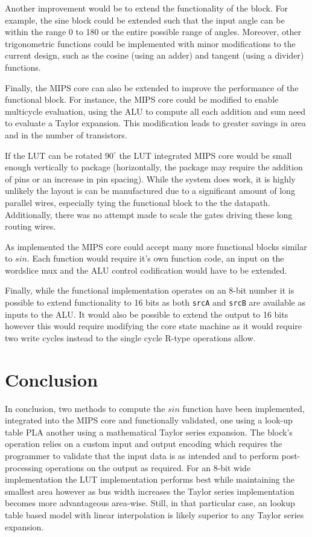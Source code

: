 \documentclass[10pt,journal]{IEEEtran}
\begin{document}
Another improvement would be to extend the functionality of the block. For example, the sine block could be extended such that the input angle can be within the range 0 to 180 or the entire possible range of angles. Moreover, other trigonometric functions could be implemented with minor modifications to the current design, such as the cosine (using an adder) and tangent (using a divider) functions.

Finally, the MIPS core can also be extended to improve the performance of the functional block. For instance, the MIPS core could be modified to enable multicycle evaluation, using the ALU to compute all each addition and sum need to evaluate a Taylor expansion. This modification  leads to greater savings in area and in the number of transistors.

If the LUT can be rotated $90^{\circ}$ the LUT integrated MIPS core would be small enough vertically to package (horizontally, the package may require the addition of pins or an increase in pin spacing). While the system does work, it is highly unlikely the layout is can be manufactured due to a significant amount of long parallel wires, especially tying the functional block to the the datapath. Additionally, there was no attempt made to scale the gates driving these long routing wires.

As implemented the MIPS core could accept many more functional blocks similar to $sin$. Each function would require it's own function code, an input on the wordslice mux and the ALU control codification would have to be extended.

Finally, while the functional implementation operates on an 8-bit number it is possible to extend functionality to 16 bits as both \texttt{srcA} and \texttt{srcB} are available as inputs to the ALU. It would also be possible to extend the output to 16 bits however this would require modifying the core state machine as it would require two write cycles instead to the single cycle R-type operations allow.

\section{Conclusion}
In conclusion, two methods to compute the $sin$ function have been implemented, integrated into the MIPS core and functionally validated, one using a look-up table PLA another using a mathematical Taylor series expansion. The block's operation relies on a custom input and output encoding which requires the programmer to validate that the input data is as intended and to perform post-processing operations on the output as required. For an 8-bit wide implementation the LUT implementation performs best while maintaining the smallest area however as bus width increases the Taylor series implementation becomes more advantageous area-wise. Still, in that particular case, an lookup table based model with linear interpolation is likely superior to any Taylor series expansion.
\end{document}
